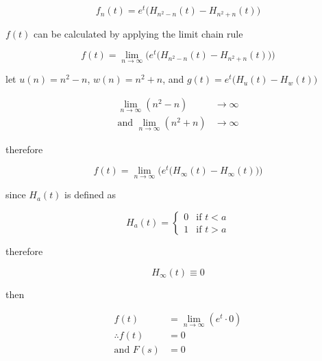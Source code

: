 \documentclass[a4paper,10pt,reqno]{amsart}
\numberwithin{equation}{section}
\begin{document}
\begin{equation}\label{eq:fn}
     f_n(t) = e^t\big(H_{n^2 - n}(t) - H_{n^2 + n}(t)\big)
\end{equation}
\vspace{1pt}

$f(t)$ can be calculated by applying the limit chain rule

\begin{equation}
     f(t) = \lim_{n \to \infty} \bigg(e^t\big(H_{n^2 - n}(t) - H_{n^2 + n}(t)\big)\bigg)
\end{equation}
\vspace{1pt}

let $u(n) = n^2 - n$, $w(n) = n^2 + n$, and $g(t) = e^t\big(H_u(t) - H_w(t)\big)$

\begin{subequations}
     \begin{align}
         \lim_{n \to \infty} (n^2 - n) &\to \infty \\
         \text{and } \lim_{n \to \infty} (n^2 + n) &\to \infty 
     \end{align}  
\end{subequations}
\vspace{1pt}

therefore

\begin{equation}
     f(t) = \lim_{n \to \infty} \bigg(e^t\big(H_{\infty}(t) - H_{\infty}(t)\big)\bigg)
\end{equation}
\vspace{1pt}

since $H_a(t)$ is defined as

\begin{equation}
    H_a(t) = 
     \begin{cases}
         0 & \text{if } t < a \\
         1 & \text{if } t > a
     \end{cases}
\end{equation}
\vspace{1pt}

therefore

\begin{equation}
     H_{\infty}(t) \equiv 0
\end{equation}

then

\begin{subequations}
     \begin{align}
          f(t) &= \lim_{n \to \infty} (e^t \cdot 0) \\
          \therefore f(t) &= 0 \\
          \text{and } F(s) &= 0 \label{eq:F}
     \end{align}
\end{subequations}
\vspace{1pt}
\end{document}
